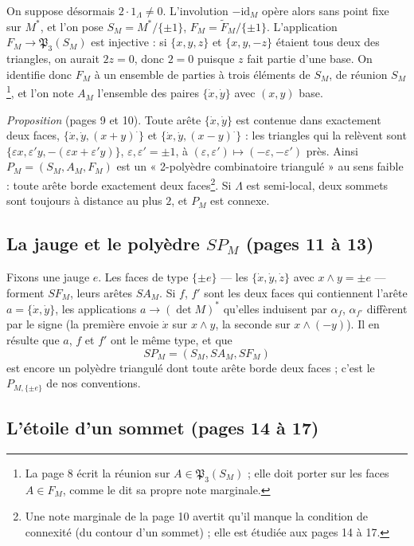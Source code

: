 \documentclass[11pt,a4paper]{article}
\begin{document}
On suppose désormais $2 \cdot 1_\Lambda \neq 0$. L'involution $-\mathrm{id}_M$
opère alors sans point fixe sur $M^{*}$, et l'on pose $S_M = M^{*}/\{\pm 1\}$,
$F_M = \widetilde{F}_M/\{\pm 1\}$. L'application $F_M \to \mathfrak{P}_3(S_M)$
est injective : si $\{x, y, z\}$ et $\{x, y, -z\}$ étaient tous deux des
triangles, on aurait $2z = 0$, donc $2 = 0$ puisque $z$ fait partie d'une base.
On identifie donc $F_M$ à un ensemble de parties à trois éléments de $S_M$, de
réunion $S_M$\footnote{La page 8 écrit la réunion sur $A \in
\mathfrak{P}_3(S_M)$ ; elle doit porter sur les faces $A \in F_M$, comme le dit
sa propre note marginale.}, et l'on note $A_M$ l'ensemble des paires $\{\dot
x, \dot y\}$ avec $(x, y)$ base.

\emph{Proposition} (pages 9 et 10). Toute arête $\{\dot x, \dot y\}$ est
contenue dans exactement deux faces, $\{\dot x, \dot y, (x+y)^{\cdot}\}$ et
$\{\dot x, \dot y, (x-y)^{\cdot}\}$ : les triangles qui la relèvent sont $\{\varepsilon
x, \varepsilon' y, -(\varepsilon x + \varepsilon' y)\}$, $\varepsilon,
\varepsilon' = \pm 1$, à $(\varepsilon, \varepsilon') \mapsto (-\varepsilon,
-\varepsilon')$ près. Ainsi $P_M = (S_M, A_M, F_M)$ est un « 2-polyèdre
combinatoire triangulé » au sens faible : toute arête borde exactement deux
faces\footnote{Une note marginale de la page 10 avertit qu'il manque la
condition de connexité (du contour d'un sommet) ; elle est étudiée aux pages
14 à 17.}. Si $\Lambda$ est semi-local, deux sommets sont toujours à distance
au plus $2$, et $P_M$ est connexe.

\subsection*{La jauge et le polyèdre $SP_M$ (pages 11 à 13)}

Fixons une jauge $e$. Les faces de type $\{\pm e\}$ --- les $\{\dot x, \dot y,
\dot z\}$ avec $x \wedge y = \pm e$ --- forment $SF_M$, leurs arêtes $SA_M$. Si
$f$, $f'$ sont les deux faces qui contiennent l'arête $a = \{\dot x, \dot y\}$,
les applications $a \to (\det M)^{*}$ qu'elles induisent par $\alpha_f$,
$\alpha_{f'}$ diffèrent par le signe (la première envoie $\dot x$ sur $x \wedge
y$, la seconde sur $x \wedge (-y)$). Il en résulte que $a$, $f$ et $f'$ ont le
même type, et que
\[
  SP_M = (S_M, SA_M, SF_M)
\]
est encore un polyèdre triangulé dont toute arête borde deux faces ; c'est le
$P_{M, \{\pm e\}}$ de nos conventions.

\subsection*{L'étoile d'un sommet (pages 14 à 17)}
\end{document}

